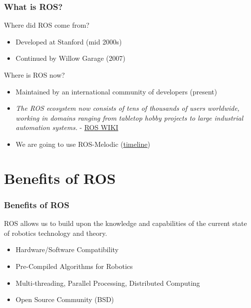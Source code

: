 \documentclass[fleqn]{beamer} %
\newcommand{\sectiontitleI}{What is ROS?} %
\newcommand{\sectiontitleII}{Benefits of ROS}
\begin{document}
	\begin{frame} \small
		\frametitle{\sectiontitleI}
Where did ROS come from?
            \begin{itemize}
                \item Developed at Stanford (mid 2000s)
                \item Continued by Willow Garage (2007)
                \end{itemize} 
                Where is ROS now?        
            
                \begin{itemize}
                \item Maintained by an international community of developers (present)
                \item {\it The ROS ecosystem now consists of tens of thousands of users worldwide, working in domains ranging from tabletop hobby projects to large industrial automation systems.} - \href{http://www.ros.org/history/}{ROS WIKI}
                \item We are going to use ROS-Melodic (\href{http://wiki.ros.org/Distributions}{timeline})
            \end{itemize} 

	\end{frame}
	
	
\section{\sectiontitleII}	

	\begin{frame}[label=sectionI] \small
		\frametitle{\sectiontitleII}

		ROS allows us to build upon the knowledge and capabilities of the current state of robotics technology and theory. \vspc

            \begin{itemize}
                \item Hardware/Software Compatibility   
				\item Pre-Compiled Algorithms for Robotics              
                \item Multi-threading, Parallel Processing, Distributed Computing  
                
                \item Open Source Community (BSD)    
            \end{itemize}    

		\end{frame}
\end{document}
